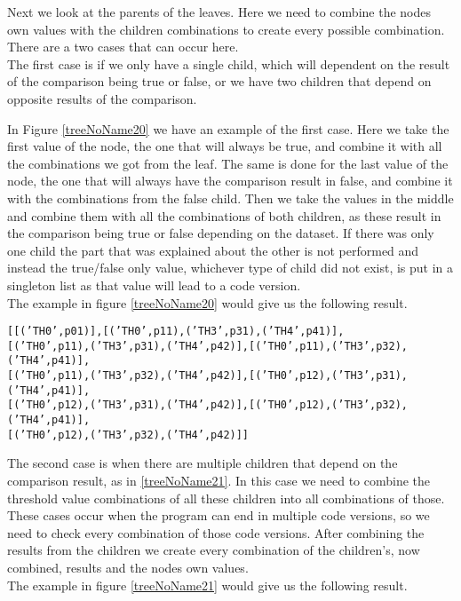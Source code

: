 Next we look at the parents of the leaves. Here we need to combine the nodes
own values with the children combinations to create every possible
combination. There are a two cases that can occur here. \\
The first case is if we only have a single child, which will dependent on the result of
the comparison being true or false, or we have two children that depend on
opposite results of the comparison. 

In Figure \ref{treeNoName20} we have an example of the first case. Here we take the first
value of the node, the one that will always be true, and combine it with all
the combinations we got from the leaf. The same is done for the last value of
the node, the one that will always have the comparison result in false, and combine it with
the combinations from the false child. Then we take the values in the middle
and combine them with all the combinations of both children, as these result in
the comparison being true or false depending on the dataset. If there was only
one child the part that was explained about the other is not performed and
instead the true/false only value, whichever type of child did not exist, is
put in a singleton list as that value will lead to a code version.\\
The example in figure \ref{treeNoName20} would give us the following result.\vspace{1em}

{\centering
  \texttt{[[('TH0',p01)],[('TH0',p11),('TH3',p31),('TH4',p41)],}\\
  \texttt{[('TH0',p11),('TH3',p31),('TH4',p42)],[('TH0',p11),('TH3',p32),('TH4',p41)],}\\
  \texttt{[('TH0',p11),('TH3',p32),('TH4',p42)],[('TH0',p12),('TH3',p31),('TH4',p41)],}\\
  \texttt{[('TH0',p12),('TH3',p31),('TH4',p42)],[('TH0',p12),('TH3',p32),('TH4',p41)],}\\
  \hspace{10em}\texttt{[('TH0',p12),('TH3',p32),('TH4',p42)]]}
}
\vspace{1em}

The second case is when 
there are multiple children that depend on the comparison result, as in
\ref{treeNoName21}. In this case we need to combine the threshold value
combinations of all these children into all combinations of those. These cases
occur when the program can end in multiple code versions, so we need to check
every combination of those code versions. After combining the results from the
children we create every combination of the children's, now combined, results
and the nodes own values. \\
The example in figure \ref{treeNoName21} would give us the following result.\vspace{1em}

